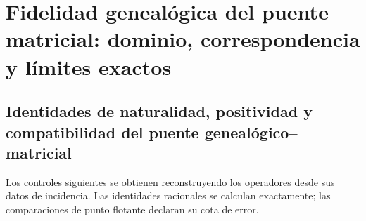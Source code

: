 \chapter{Fidelidad genealógica del puente matricial: dominio, correspondencia y límites exactos}
\label{gmc:app:certificado}

\section{Identidades de naturalidad, positividad y compatibilidad del puente genealógico–matricial}

Los controles siguientes se obtienen reconstruyendo los operadores desde sus
datos de incidencia. Las identidades racionales se calculan exactamente; las
comparaciones de punto flotante declaran su cota de error.


